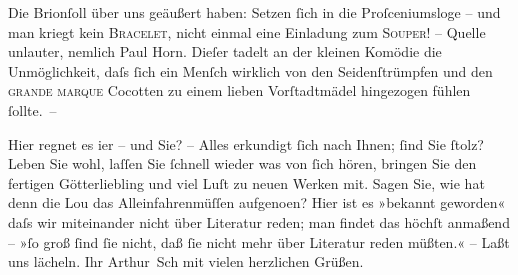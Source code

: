 \pstart
           Die Brionſoll über uns geäußert haben: Setzen{ }ſich in die
               Proſceniumsloge – und {\pb}man kriegt kein \textsc{Bracelet}, nicht einmal eine Einladung zum \textsc{Souper}! – Quelle unlauter, nemlich Paul Horn. Dieſer tadelt an der kleinen Komödie die Unmöglichkeit, daſs{ }ſich ein Menſch
               wirklich von den Seidenſtrümpfen und den \textsc{grande marque}
               Cocotten zu einem lieben Vorſtadtmädel hingezogen fühlen{ }ſollte. –\pend
           
\pstart
           Hier regnet es i{\geminationm}er – und Sie? – Alles erkundigt{ }ſich
               nach Ihnen;{ }ſind Sie{ }ſtolz? Leben Sie wohl, laſſen Sie{ }ſchnell {\pb}wieder was von{ }ſich hören, bringen Sie den fertigen
                  Götterliebling und viel
               Luſt zu neuen Werken mit. Sagen Sie, wie hat denn die Lou das Alleinfahrenmüſſen aufgeno{\geminationm}en? Hier ist es »bekannt geworden« daſs wir miteinander nicht über Literatur reden;
               man findet das höchſt anmaßend – »ſo groß{ }ſind{ }ſie nicht, daß{ }ſie nicht mehr über
               Literatur reden müßten.« – Laßt uns lächeln.\pend
           \pstart Ihr \spacefill\mbox{Arthur Sch} mit vielen herzlichen Grüßen.\pend{}\endnumbering{}  \newcommand{\dateiname}{L00483}\newcommand{\titel}{Arthur Schnitzler an Richard Beer-Hofmann, 15. 9. 1895}\newcommand{\editorInnen}{Herausgegeben von Martin Anton Müller}
